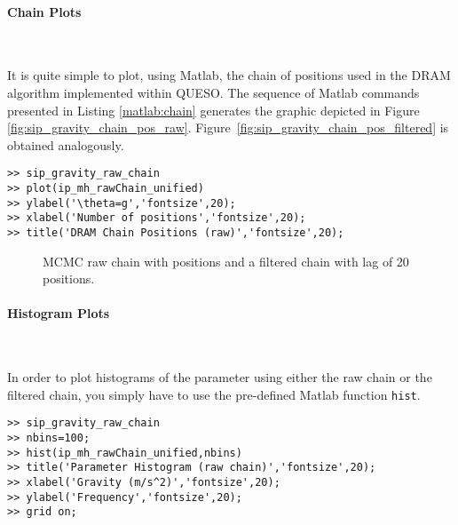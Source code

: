 \paragraph{Chain Plots}\

It is quite simple to plot, using Matlab, the chain of positions used in the DRAM algorithm implemented within QUESO. 
The sequence of Matlab commands presented in Listing \ref{matlab:chain} generates the graphic depicted in Figure \ref{fig:sip_gravity_chain_pos_raw}.
Figure~\ref{fig:sip_gravity_chain_pos_filtered} is obtained analogously. %

\begin{lstlisting}[label=matlab:chain,caption={Matlab code for the chain plot.}]
% inside Matlab
>> sip_gravity_raw_chain
>> plot(ip_mh_rawChain_unified)
>> ylabel('\theta=g','fontsize',20);
>> xlabel('Number of positions','fontsize',20);
>> title('DRAM Chain Positions (raw)','fontsize',20);
\end{lstlisting}

\begin{figure}[p]
\centering 
{}
\vspace*{-10pt}
\caption{MCMC raw chain with \chainsizeresults{} positions and a filtered chain with lag of 20 positions.}
\end{figure}

\paragraph{Histogram Plots}\

In order to plot histograms of the parameter using either the raw chain or the filtered chain, you simply have to use the pre-defined Matlab function \verb+hist+.
%
\begin{lstlisting}[label=matlab:hist,caption={Matlab code for the histogram plot.}]
% inside Matlab
>> sip_gravity_raw_chain
>> nbins=100;
>> hist(ip_mh_rawChain_unified,nbins)
>> title('Parameter Histogram (raw chain)','fontsize',20);
>> xlabel('Gravity (m/s^2)','fontsize',20);
>> ylabel('Frequency','fontsize',20);
>> grid on;
\end{lstlisting}

